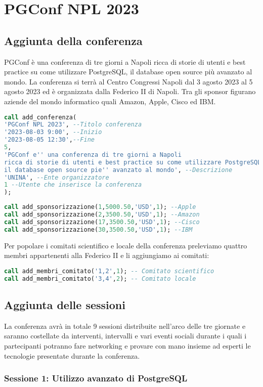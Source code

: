 \section{PGConf NPL 2023}
\subsection{Aggiunta della conferenza}
PGConf è una conferenza di tre giorni a Napoli ricca di storie di utenti e best practice su come utilizzare PostgreSQL, il database open source più avanzato al mondo. La conferenza si terrà al Centro Congressi Napoli dal 3 agosto 2023 al 5 agosto 2023 ed è organizzata dalla Federico II di Napoli. Tra gli sponsor figurano aziende del mondo informatico quali Amazon, Apple, Cisco ed IBM. 
\begin{lstlisting}[language=SQL, style=mystyle,caption={Aggiunta della conferenza}]
call add_conferenza(
'PGConf NPL 2023', --Titolo conferenza
'2023-08-03 9:00', --Inizio
'2023-08-05 12:30',--Fine
5,
'PGConf e'' una conferenza di tre giorni a Napoli 
ricca di storie di utenti e best practice su come utilizzare PostgreSQL, 
il database open source pie'' avanzato al mondo', --Descrizione
'UNINA', --Ente organizzatore
1 --Utente che inserisce la conferenza 
);
\end{lstlisting}
\begin{lstlisting}[language=SQL,style=mystyle,caption={Aggiunta delle sponsorizzazioni}]
call add_sponsorizzazione(1,5000.50,'USD',1); --Apple
call add_sponsorizzazione(2,3500.50,'USD',1); --Amazon
call add_sponsorizzazione(17,3500.50,'USD',1); --Cisco
call add_sponsorizzazione(30,3500.50,'USD',1); --IBM
\end{lstlisting}
Per popolare i comitati scientifico e locale della conferenza preleviamo quattro membri appartenenti alla Federico II e li aggiungiamo ai comitati:
\begin{lstlisting}[caption={Aggiunta degli organizzatori nei comitati scientifici e locali della conferenza},language=sql,style=mystyle]
call add_membri_comitato('1,2',1); -- Comitato scientifico
call add_membri_comitato('3,4',2); -- Comitato locale
\end{lstlisting}
\subsection{Aggiunta delle sessioni}
La conferenza avrà in totale 9 sessioni distribuite nell'arco delle tre giornate e saranno costellate da interventi, intervalli e vari eventi sociali durante i quali i partecipanti potranno fare networking e provare con mano insieme ad esperti le tecnologie presentate durante la conferenza.
\subsubsection{Sessione 1: Utilizzo avanzato di PostgreSQL}
